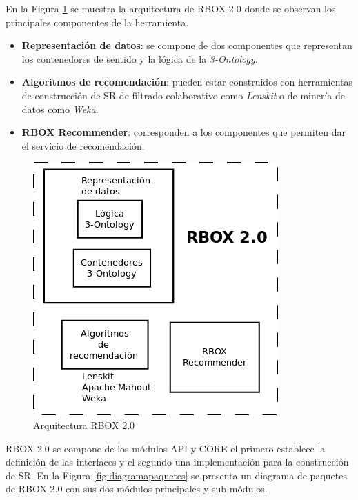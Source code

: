 En la Figura \ref{fig:arquitectura} se muestra la arquitectura de RBOX 2.0 donde se observan los principales componentes de la herramienta.

\begin{itemize}
\item \textbf{Representación de datos}: se compone de dos componentes que representan los contenedores de sentido y la lógica de la \textit{3-Ontology}.
\item \textbf{Algoritmos de recomendación}: pueden estar construidos con herramientas de construcción de SR de filtrado colaborativo como \textit{Lenskit} o de minería de datos como \textit{Weka}.
\item \textbf{RBOX Recommender}: corresponden a los componentes que permiten dar el servicio de recomendación.
\end{itemize}


\begin{figure}[tp]
	\centering
	\includegraphics[scale=.6]{images/arquitectura.png}
	\caption{Arquitectura RBOX 2.0 }
	\label{fig:arquitectura}
\end{figure}

RBOX 2.0 se compone de los módulos API y CORE el primero establece la definición de las interfaces y el segundo una implementación para la construcción de SR. En la Figura \ref{fig:diagramapaquetes} se presenta un diagrama de paquetes de RBOX 2.0 con sus dos módulos principales y sub-módulos.

